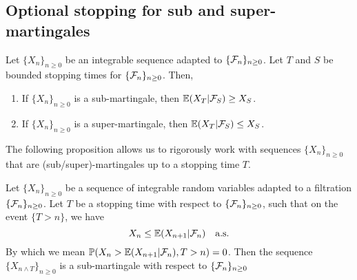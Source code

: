 \subsection{Optional stopping for sub and super-martingales}
\begin{proposition}
    Let  $\{X_n\}_{n \ge   0}$ be an  integrable sequence adapted to $\{{\mathcal{F}}_n\}_{n  \ge 0}$.  Let $T$  and  $S$  be bounded stopping  times for  $\{{\mathcal{F}}_n\}_{n \ge 0}$. Then,
    \begin{enumerate}
        \item If  $\{X_n\}_{n \ge 0}$  is  a  sub-martingale,  then ${\mathbb{E}}(X_T|{\mathcal{F}}_S)  \ge  X_S$.
        \item If  $\{X_n\}_{n  \ge 0}$ is a super-martingale, then ${\mathbb{E}}(X_T|{\mathcal{F}}_S) \le  X_S$.
    \end{enumerate}
\end{proposition}
The  following proposition allows us to rigorously work with sequences  $\{X_n\}_{n \ge  0}$   that  are (sub/super)-martingales up  to  a stopping time $T$.
\begin{proposition}\label{up_to}
    Let  $\{X_n\}_{n \ge  0}$ be a  sequence of integrable random variables adapted to a filtration $\{{\mathcal{F}}_n\}_{n \ge 0}$. Let $T$ be a stopping time with respect to $\{{\mathcal{F}}_n\}_{n \ge 0}$, such that on the event $\{T>n\}$, we have
    \begin{equation}
        \label{ineq} X_n \le {\mathbb{E}}(X_{n+1}|{\mathcal{F}}_n)~~~\text{a.s.}
    \end{equation}
    By which we mean ${\mathbb{P}}(X_n > {\mathbb{E}}(X_{n+1}|{\mathcal{F}}_n), T > n) = 0$. Then the sequence $\{X_{n \land T}\}_{n \ge 0}$ is a sub-martingale with respect to $\{{\mathcal{F}}_n\}_{n \ge 0}$
\end{proposition}

